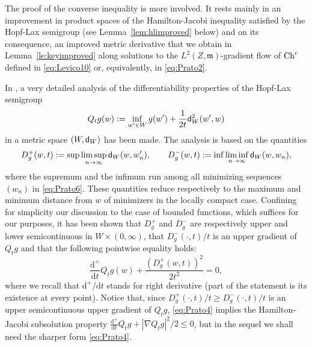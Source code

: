 \documentclass[reqno,11pt]{article}
\numberwithin{equation}{section}
\newcommand{\C}{\mathbb{C}}
\newcommand{\mm}{{\mbox{\boldmath$m$}}}
\newcommand{\sfd}{{\sf d}}
\renewcommand{\d}{{\mathrm d}}
\renewcommand{\C}{{\rm Ch}}
\renewcommand{\mm}{\mathfrak m}
\begin{document}
The proof of the converse inequality is more involved. It rests
mainly in an improvement in product spaces of the Hamilton-Jacobi
inequality satisfied by the Hopf-Lax semigroup (see
Lemma~\ref{lem:hlimproved} below) and on its consequence, an
improved metric derivative that we obtain in
Lemma~\ref{le:keyimproved} along solutions to the
$L^2(Z,\mm)$-gradient flow of $\C^c$ defined in \eqref{eq:Levico10}
or, equivalently, in \eqref{eq:Prato2}.

In \cite[Section~3]{Ambrosio-Gigli-Savare11}, a very detailed
analysis of the differentiability properties of the Hopf-Lax
semigroup
\begin{equation}\label{eq:Prato6}
Q_tg(w):=\inf_{w'\in W} g(w')+\frac{1}{2t}\sfd_W^2(w',w)
\end{equation}
in a metric space $(W,\sfd_W)$ has been made. The analysis is based
on the quantities
$$
D^+_g(w,t):=\sup\limsup_{n\to\infty} \sfd_W(w,w_n'),\qquad
D^-_g(w,t):=\inf\liminf_{n\to\infty} \sfd_W(w,w_n),
$$
where the supremum and the infimum run among all minimizing
sequences $(w_n)$ in \eqref{eq:Prato6}. These quantities reduce
respectively to the maximum and minimum distance from $w$ of
minimizers in the locally compact case. Confining for simplicity our
discussion to the case of bounded functions, which suffices for our
purposes, it has been shown that $D^+_g$ and $D^-_g$ are
respectively upper and lower semicontinuous in $W\times (0,\infty)$,
that $D^-_g(\cdot,t)/t$ is an upper gradient of $Q_tg$ and that the
following pointwise equality holds:
\begin{equation}\label{eq:Prato4}
\frac{\d^+}{\d t}Q_tg(w)+\frac{(D^+_g(w,t))^2}{2t^2}=0,
\end{equation}
where we recall that $\d^+/\d t$ stands for right derivative (part
of the statement is its existence at every point). Notice that,
since $D^+_g(\cdot,t)/t\geq D^-_g(\cdot,t)/t$ is an upper
semicontinuous upper gradient of $Q_t g$, \eqref{eq:Prato4} implies
the Hamilton-Jacobi subsolution property $\tfrac{\d^+}{\d
t}Q_tg+|\nabla Q_tg|^2/2\leq 0$, but in the sequel we shall need the
sharper form \eqref{eq:Prato4}.
\end{document}
